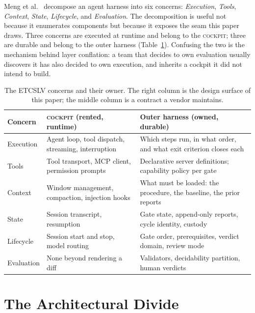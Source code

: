 \documentclass[10pt,a4paper]{article}
\theoremstyle{definition}
\theoremstyle{plain}
\theoremstyle{principle}
\newcommand{\ck}{\textsc{cockpit}}
\begin{document}
Meng et al.~\cite{meng2026} decompose an agent harness into six concerns: \emph{Execution},
\emph{Tools}, \emph{Context}, \emph{State}, \emph{Lifecycle}, and \emph{Evaluation}. The
decomposition is useful not because it enumerates components but because it exposes the seam
this paper draws. Three concerns are executed at runtime and belong to the \ck{}; three are
durable and belong to the outer harness (Table~\ref{tab:etcslv}). Confusing the two is the
mechanism behind layer conflation: a team that decides to own evaluation usually discovers it has
also decided to own execution, and inherits a cockpit it did not intend to build.

\begin{table}[htbp]
\centering
\caption{The ETCSLV concerns and their owner. The right column is the design surface of this
paper; the middle column is a contract a vendor maintains.}
\label{tab:etcslv}
\small
\begin{tabularx}{\textwidth}{@{}p{1.75cm} >{\raggedright\arraybackslash}X >{\raggedright\arraybackslash}X@{}}
\toprule
\textbf{Concern} & \textbf{\ck{} (rented, runtime)} & \textbf{Outer harness (owned, durable)} \\
\midrule
Execution & Agent loop, tool dispatch, streaming, interruption & Which steps run, in what order, and what exit criterion closes each \\
Tools & Tool transport, MCP client, permission prompts & Declarative server definitions; capability policy per gate \\
Context & Window management, compaction, injection hooks & What must be loaded: the procedure, the baseline, the prior reports \\
State & Session transcript, resumption & Gate state, append-only reports, cycle identity, custody \\
Lifecycle & Session start and stop, model routing & Gate order, prerequisites, verdict domain, review mode \\
Evaluation & None beyond rendering a diff & Validators, decidability partition, human verdicts \\
\bottomrule
\end{tabularx}
\end{table}

\section{The Architectural Divide}\label{sec:divide}
\end{document}
